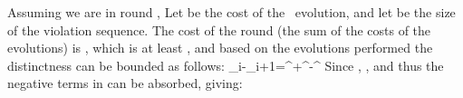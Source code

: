 Assuming we are in round , Let  be the cost of the \opEm\ evolution, and let  be the size of the violation sequence.
The cost of the round (the sum of the costs of the evolutions) is , which is at least , and based on the evolutions performed the distinctness can be bounded as follows: 
\shortfull{}{}\Distinct_i-\Distinct_{i+1}=^\opEm +^\eBs-^\ePerm{}
Since , 
, and thus
the negative terms in can be absorbed, giving:
